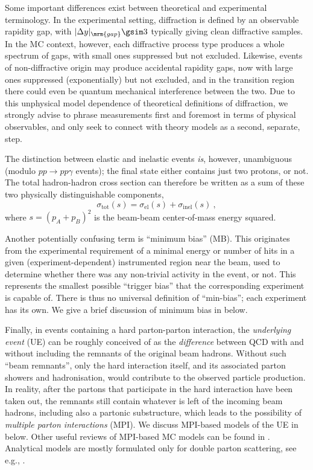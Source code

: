 Some important differences exist between theoretical and experimental 
terminology\cite{Khoze:2010by}.  In the experimental setting, 
diffraction is defined by an observable rapidity gap, with 
$|\Delta y|_\mrm{gap} \gsim 3$ typically giving clean diffractive
samples. 
In the MC context, however, 
each diffractive process type produces a
whole spectrum of gaps, with small ones suppressed but not
excluded. Likewise, events of non-diffractive origin may produce accidental
rapidity gaps, now with large ones suppressed (exponentially) 
but not excluded, and in
the transition region there could even be quantum mechanical
interference between the two. Due to this unphysical 
model dependence of theoretical definitions of diffraction, 
we strongly advise to phrase measurements first and foremost in terms
of physical observables, and only seek to connect with theory
models as a second, separate, step. 

The distinction between elastic and
inelastic events \emph{is}, however, unambiguous (modulo $pp \to
pp\gamma$ events); the final state either contains just two 
protons, or not.
The total hadron-hadron cross section can therefore be written as
a sum of these two physically distinguishable components, 
\begin{equation}
\sigma_{\mathrm{tot}}(s) = 
\sigma_{\mathrm{el}}(s) +
\sigma_{\mathrm{inel}}(s)~, 
\end{equation}
where $s=(p_A+p_B)^2$ is the beam-beam center-of-mass energy squared. 

Another potentially confusing term is ``minimum bias'' (MB). This 
originates from the experimental requirement of a minimal energy or 
number of hits
in a given (experiment-dependent) instrumented region near the beam,
used to determine whether  
there was any non-trivial activity in the event, or not. This
represents the smallest possible 
``trigger bias'' that the corresponding experiment is capable of. 
There is thus no universal definition of ``min-bias''; each
experiment has its own. We give a brief discussion of minimum bias 
in  below.

Finally, in events containing a hard parton-parton interaction,
the \emph{underlying event} (UE) can be roughly conceived of as
the \emph{difference} between QCD with and without including the
remnants of the original beam hadrons.  Without such ``beam
remnants'', only the hard interaction itself, and its  
associated parton showers and hadronisation, would contribute to the
observed particle production. In reality, after the partons that
participate in the hard interaction have been taken out, 
the remnants still contain whatever is left of the incoming beam hadrons,
including also a partonic substructure, which leads to the possibility
of  \emph{multiple parton interactions}
(MPI). We discuss MPI-based models of the UE in 
below. 
Other useful reviews of MPI-based MC models can be found
in \cite{Buckley:2011ms,Skands:2011pf}. Analytical models are mostly
formulated only for double parton scattering, see
e.g., \cite{Blok:2010ge,Blok:2011bu,Gaunt:2012wv,Manohar:2012jr}.  

